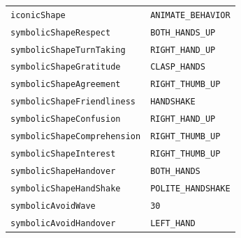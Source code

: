 \documentclass{CSSRforAfrica}
\begin{document}
\begin{table}[H]
\begin{tabular}{l l}
{\footnotesize \verb+iconicShape+} 	                                          & {\footnotesize \verb+ANIMATE_BEHAVIOR+} \vspace{-1.5mm}\\
{\footnotesize \verb+symbolicShapeRespect+}                                 & {\footnotesize \verb+BOTH_HANDS_UP+ } \vspace{-1.5mm}\\
{\footnotesize \verb+symbolicShapeTurnTaking+}                          & {\footnotesize \verb+RIGHT_HAND_UP+ } \vspace{-1.5mm}\\
{\footnotesize \verb+symbolicShapeGratitude+} 	                          & {\footnotesize \verb+CLASP_HANDS+} \vspace{-1.5mm}\\
{\footnotesize \verb+symbolicShapeAgreement+}                           & {\footnotesize \verb+RIGHT_THUMB_UP+} \vspace{-1.5mm}\\
{\footnotesize \verb+symbolicShapeFriendliness+}                          & {\footnotesize \verb+HANDSHAKE+ } \vspace{-1.5mm}\\
{\footnotesize \verb+symbolicShapeConfusion+} 	                          & {\footnotesize \verb+RIGHT_HAND_UP+ } \vspace{-1.5mm}\\
{\footnotesize \verb+symbolicShapeComprehension+} 	                  & {\footnotesize \verb+RIGHT_THUMB_UP+ } \vspace{-1.5mm}\\
{\footnotesize \verb+symbolicShapeInterest+} 	                          & {\footnotesize \verb+RIGHT_THUMB_UP+ } \vspace{-1.5mm}\\
{\footnotesize \verb+symbolicShapeHandover+} 	                          & {\footnotesize \verb+BOTH_HANDS+} \vspace{-1.5mm}\\
{\footnotesize \verb+symbolicShapeHandShake+} 	                  & {\footnotesize \verb+POLITE_HANDSHAKE+} \vspace{-1.5mm}\\
{\footnotesize \verb+symbolicAvoidWave+} 	                                  & {\footnotesize \verb+30+  } \vspace{-1.5mm}\\
{\footnotesize \verb+symbolicAvoidHandover+} 	                          & {\footnotesize \verb+LEFT_HAND+} \vspace{-1.5mm}\\

\end{tabular}
\end{table}
\end{document}
